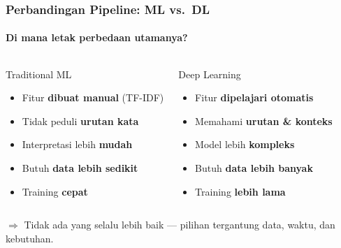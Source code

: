 \documentclass[t,aspectratio=169,xcolor=dvipsnames]{beamer}
\begin{document}
\begin{frame}
    \frametitle{Perbandingan Pipeline: ML vs.\ DL}
    \framesubtitle{Di mana letak perbedaan utamanya?}
    \small
    \begin{columns}[T]
        \begin{block}{Traditional ML}
            \begin{itemize}
                \item Fitur \textbf{dibuat manual} (TF-IDF)
                \item Tidak peduli \textbf{urutan kata}
                \item Interpretasi lebih \textbf{mudah}
                \item Butuh \textbf{data lebih sedikit}
                \item Training \textbf{cepat}
            \end{itemize}
        \end{block}

        \begin{exampleblock}{Deep Learning}
            \begin{itemize}
                \item Fitur \textbf{dipelajari otomatis}
                \item Memahami \textbf{urutan \& konteks}
                \item Model lebih \textbf{kompleks}
                \item Butuh \textbf{data lebih banyak}
                \item Training \textbf{lebih lama}
            \end{itemize}
        \end{exampleblock}
    \end{columns}

    \vspace{0.6em}
    \begin{center}
        \small
        \textcolor{nyubluedarker}{%
            $\Rightarrow$ Tidak ada yang selalu lebih baik — pilihan tergantung data, waktu, dan kebutuhan.%
        }
    \end{center}
\end{frame}
\end{document}
